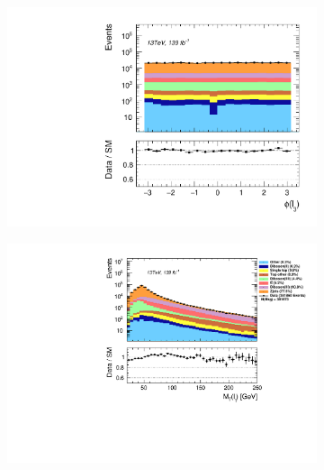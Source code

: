 \begin{figure}[H]
{\begin{subfigure}{.405\textwidth}
        \includegraphics[width=\textwidth]{Figures/FeaturesHistograms/lep3_Phi.pdf}
        \caption{}
        \label{fig:lep3_Phi}
    \end{subfigure}
    \hfill
    \begin{subfigure}{.525\textwidth}
        \includegraphics[width=\textwidth]{Figures/FeaturesHistograms/lep1_Mt.pdf}
        \caption{}
        \label{fig:lep1_Mt}
    \end{subfigure}
    }
\end{figure}
